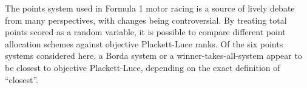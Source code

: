 \documentclass{elsarticle}
\begin{document}
The points system used in Formula 1 motor racing is a source of lively
debate from many perspectives, with changes being controversial.  By
treating total points scored as a random variable, it is possible to
compare different point allocation schemes against objective
Plackett-Luce ranks.  Of the six points systems considered here, a
Borda system or a winner-takes-all-system appear to be closest to
objective Plackett-Luce, depending on the exact definition of
``closest''.


\end{document}
